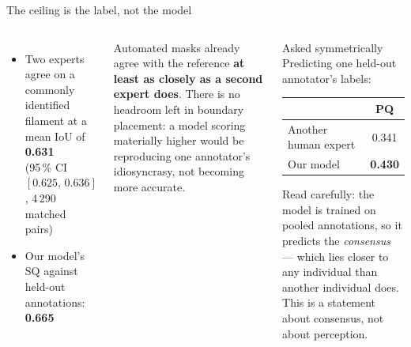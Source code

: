 \documentclass[aspectratio=169,xcolor=dvipsnames]{beamer}
\begin{document}
\begin{frame}{The ceiling is the label, not the model}
  \begin{columns}
      \begin{itemize}
        \item Two experts agree on a commonly identified filament at a mean IoU of \textbf{0.631} \\ {\small(95\,\% CI $[0.625,\,0.636]$, 4\,290 matched pairs)}
        \item Our model's SQ against held-out annotations: \textbf{0.665}
      \end{itemize}
      \vspace{0.3cm}
      \begin{exampleblock}{}
        \small Automated masks already agree with the reference \textbf{at least as closely as a second expert does}. There is no headroom left in boundary placement: a model scoring materially higher would be reproducing one annotator's idiosyncrasy, not becoming more accurate.
      \end{exampleblock}
      \begin{block}{Asked symmetrically}
        Predicting one held-out annotator's labels:
        \vspace{0.2cm}
        \begin{tabular}{lc}
          \toprule
          & PQ \\
          \midrule
          Another human expert & 0.341 \\
          Our model & \textbf{0.430} \\
          \bottomrule
        \end{tabular}
        \vspace{0.2cm}
        \small Read carefully: the model is trained on pooled annotations, so it predicts the \emph{consensus} --- which lies closer to any individual than another individual does. This is a statement about consensus, not about perception.
      \end{block}
  \end{columns}
\end{frame}
\end{document}
